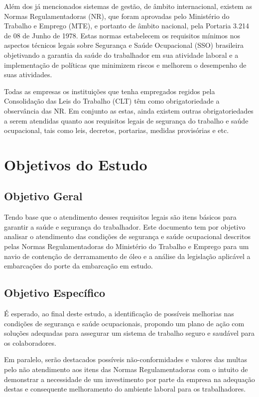 \documentclass[../main.tex]{subfiles}
\begin{document}
Além dos já mencionados sistemas de gestão, de âmbito internacional, existem as Normas Regulamentadoras (NR), que foram aprovadas pelo Ministério do Trabalho e Emprego (MTE), e portanto de âmbito nacional, pela Portaria 3.214 de 08 de Junho de 1978. Estas normas estabelecem os requisitos mínimos nos aspectos técnicos legais sobre Segurança e Saúde Ocupacional (SSO) brasileira objetivando a garantia da saúde do trabalhador em sua atividade laboral e a implementação de políticas que minimizem riscos e melhorem o desempenho de suas atividades.

Todas as empresas os instituições que tenha empregados regidos pela Consolidação das Leis do Trabalho (CLT) têm como obrigatoriedade a observância das NR. Em conjunto as estas, ainda existem outras obrigatoriedades a serem atendidas quanto aos requisitos legais de segurança do trabalho e saúde ocupacional, tais como leis, decretos, portarias, medidas provisórias e etc.

\section{Objetivos do Estudo}
\subsection{Objetivo Geral}
Tendo base que o atendimento desses requisitos legais são itens básicos para garantir a saúde e segurança do trabalhador. Este documento tem por objetivo analisar o atendimento das condições de segurança e saúde ocupacional descritos pelas Normas Regulamentadoras do Ministério do Trabalho e Emprego para um navio de contenção de derramamento de óleo e a análise da legislação aplicável a embarcações do porte da embarcação em estudo.
\subsection{Objetivo Específico}
É esperado, ao final deste estudo, a identificação de possíveis melhorias nas condições de segurança e saúde ocupacionais, propondo um plano de ação com soluções adequadas para assegurar um sistema de trabalho seguro e saudável para os colaboradores.

Em paralelo, serão destacados possíveis não-conformidades e valores das multas pelo não atendimento aos itens das Normas Regulamentadoras com o intuito de demonstrar a necessidade de um investimento por parte da empresa na adequação destas e consequente melhoramento do ambiente laboral para os trabalhadores.
\end{document}
